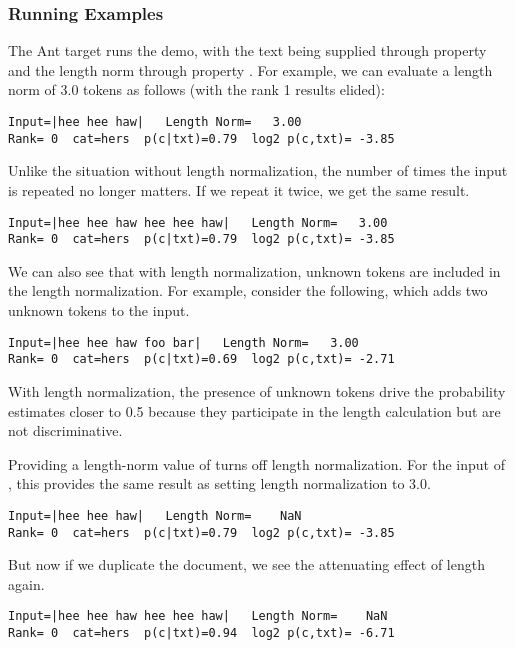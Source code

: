 \subsubsection{Running Examples}

The Ant target  runs the demo, with the text being
supplied through property  and the length norm through
property .  For example, we can evaluate a length
norm of 3.0 tokens as follows (with the rank 1 results elided):
%
\begin{verbatim}
Input=|hee hee haw|   Length Norm=   3.00
Rank= 0  cat=hers  p(c|txt)=0.79  log2 p(c,txt)= -3.85
\end{verbatim}
%
Unlike the situation without length normalization, the number of
times the input is repeated no longer matters.  If we repeat it twice,
we get the same result.
%
\begin{verbatim}
Input=|hee hee haw hee hee haw|   Length Norm=   3.00
Rank= 0  cat=hers  p(c|txt)=0.79  log2 p(c,txt)= -3.85
\end{verbatim}

We can also see that with length normalization, unknown tokens
are included in the length normalization.  For example, consider
the following, which adds two unknown tokens to the input.
%
\begin{verbatim}
Input=|hee hee haw foo bar|   Length Norm=   3.00
Rank= 0  cat=hers  p(c|txt)=0.69  log2 p(c,txt)= -2.71
\end{verbatim}
%
With length normalization, the presence of unknown tokens drive
the probability estimates closer to 0.5 because they participate
in the length calculation but are not discriminative.  

Providing a length-norm value of  turns off
length normalization.  For the input of ,
this provides the same result as setting length normalization to
3.0.
%
\begin{verbatim}
Input=|hee hee haw|   Length Norm=    NaN
Rank= 0  cat=hers  p(c|txt)=0.79  log2 p(c,txt)= -3.85
\end{verbatim}
%
But now if we duplicate the document, we see the attenuating
effect of length again.
%
\begin{verbatim}
Input=|hee hee haw hee hee haw|   Length Norm=    NaN
Rank= 0  cat=hers  p(c|txt)=0.94  log2 p(c,txt)= -6.71
\end{verbatim}



